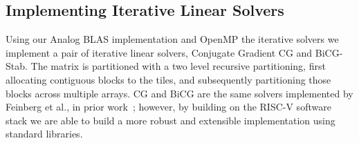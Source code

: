 \subsection{Implementing Iterative Linear Solvers}

Using our Analog BLAS implementation and OpenMP the iterative solvers we implement a pair of iterative linear solvers, Conjugate Gradient CG and BiCG-Stab.
The matrix is partitioned with a two level recursive partitioning, first allocating contiguous blocks to the tiles, and subsequently partitioning those blocks across multiple arrays.
CG and BiCG are the same solvers implemented by Feinberg et al., in prior work~\cite{8416841}; however, by building on the RISC-V software stack we are able to build a more robust and extensible implementation using standard libraries. 